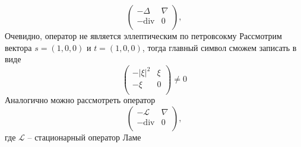 \begin{example}
   \begin{equation}
      \begin{pmatrix}
         -\Delta& \nabla \\
         -\text{div} &  0 \\
         \end{pmatrix},
   \end{equation}
   Очевидно, оператор не является эллептическим по петровсокму
   Рассмотрим вектора $s = (1, 0, 0)$ и $t = (1, 0, 0)$, тогда главный символ сможем записать в виде 
   \begin{equation}
      \begin{pmatrix}
         -|\xi|^2& \xi \\
         -\xi &  0 \\
         \end{pmatrix}\ne 0
   \end{equation}
   Аналогично можно рассмотреть оператор 
   \begin{equation*}
      \begin{pmatrix}
         -\mathcal{L}& \nabla \\
         -\text{div} &  0 \\
         \end{pmatrix},
   \end{equation*}
   где $\mathcal{L}$ -- стационарный оператор Ламе
\end{example}


\newpage

\renewcommand\refname{\centering Список использованной литературы}
\begin{thebibliography}{99}

\end{thebibliography}
